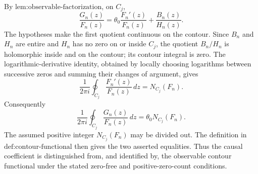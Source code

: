 By \(\text{lem:observable-factorization}\), on \(C_j\),
\[
 \frac{G_n(z)}{F_n(z)}
 =\theta_0\frac{F_n'(z)}{F_n(z)}+\frac{B_n(z)}{H_n(z)}.
\]
The hypotheses make the first quotient continuous on the contour.  Since \(B_n\) and \(H_n\) are entire and \(H_n\) has no zero on or inside \(C_j\), the quotient \(B_n/H_n\) is holomorphic inside and on the contour; its contour integral is zero.  The logarithmic-derivative identity, obtained by locally choosing logarithms between successive zeros and summing their changes of argument, gives
\[
 \frac{1}{2\pi i}\oint_{C_j}\frac{F_n'(z)}{F_n(z)}\,dz=N_{C_j}(F_n).
\]
Consequently
\[
 \frac{1}{2\pi i}\oint_{C_j}\frac{G_n(z)}{F_n(z)}\,dz
 =\theta_0N_{C_j}(F_n).
\]
The assumed positive integer \(N_{C_j}(F_n)\) may be divided out.  The definition in \(\text{def:contour-functional}\) then gives the two asserted equalities.  Thus the causal coefficient is distinguished from, and identified by, the observable contour functional under the stated zero-free and positive-zero-count conditions.